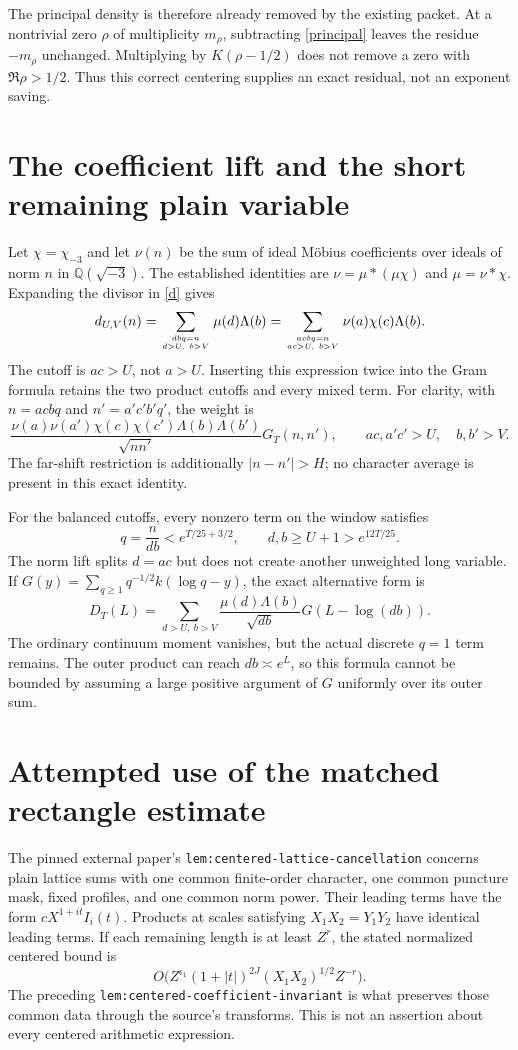 \documentclass[11pt]{article}
\begin{document}
The principal density is therefore already removed by the existing
packet. At a nontrivial zero $\rho$ of multiplicity $m_\rho$, subtracting
\eqref{principal} leaves the residue $-m_\rho$ unchanged. Multiplying
by $K(\rho-1/2)$ does not remove a zero with $\Re\rho>1/2$.
Thus this correct centering supplies an exact residual, not an exponent saving.

\section{The coefficient lift and the short remaining plain variable}
Let $\chi=\chi_{-3}$ and let $\nu(n)$ be the sum of ideal M\"obius
coefficients over ideals of norm $n$ in $\mathbb Q(\sqrt{-3})$.
The established identities are $\nu=\mu*(\mu\chi)$ and
$\mu=\nu*\chi$. Expanding the divisor in \eqref{d} gives
\begin{equation}\label{lift}
 d_{U,V}(n)=\sum_{dbq=n\atop d>U,\ b>V}\mu(d)\Lambda(b)
 =\sum_{acbq=n\atop ac>U,\ b>V}\nu(a)\chi(c)\Lambda(b).
\end{equation}
The cutoff is $ac>U$, not $a>U$. Inserting this expression twice into
the Gram formula retains the two product cutoffs and every mixed term.
For clarity, with $n=acbq$ and $n'=a'c'b'q'$, the weight is
\[
 \frac{\nu(a)\nu(a')\chi(c)\chi(c')\Lambda(b)\Lambda(b')}
 {\sqrt{nn'}}G_T(n,n'),
 \qquad ac,a'c'>U,\quad b,b'>V.
\]
The far-shift restriction is additionally $|n-n'|>H$; no character
average is present in this exact identity.

For the balanced cutoffs, every nonzero term on the window satisfies
\begin{equation}\label{short}
 q=\frac{n}{db}< e^{T/25+3/2},
 \qquad d,b\ge U+1>e^{12T/25}.
\end{equation}
The norm lift splits $d=ac$ but does not create another unweighted
long variable. If
$G(y)=\sum_{q\ge1}q^{-1/2}k(\log q-y)$, the exact alternative form is
\[
 D_T(L)=\sum_{d>U,\ b>V}\frac{\mu(d)\Lambda(b)}{\sqrt{db}}
                  G(L-\log(db)).
\]
The ordinary continuum moment vanishes, but the actual discrete $q=1$
term remains. The outer product can reach $db\asymp e^L$, so this
formula cannot be bounded by assuming a large positive argument of $G$
uniformly over its outer sum.

\section{Attempted use of the matched rectangle estimate}
The pinned external paper's \texttt{lem:centered-lattice-cancellation}
concerns plain lattice sums with one common finite-order character,
one common puncture mask, fixed profiles, and one common norm power.
Their leading terms have the form
$cX^{1+it}I_i(t)$. Products at scales satisfying
$X_1X_2=Y_1Y_2$ have identical leading terms. If each remaining length
is at least $Z^r$, the stated normalized centered bound is
\[
 O\bigl(Z^{\epsilon_1}(1+|t|)^{2J}
                (X_1X_2)^{1/2}Z^{-r}\bigr).
\]
The preceding \texttt{lem:centered-coefficient-invariant} is what
preserves those common data through the source's transforms.
This is not an assertion about every centered arithmetic expression.
\end{document}

